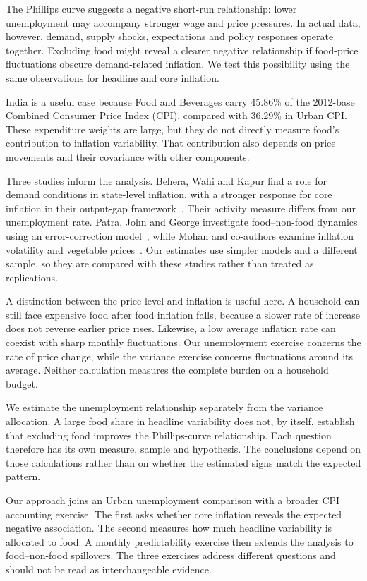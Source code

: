 \documentclass[10pt,a4paper]{article}
\begin{document}
The Phillips curve suggests a negative short-run relationship: lower unemployment may accompany stronger wage and price pressures. In actual data, however, demand, supply shocks, expectations and policy responses operate together. Excluding food might reveal a clearer negative relationship if food-price fluctuations obscure demand-related inflation. We test this possibility using the same observations for headline and core inflation.

India is a useful case because Food and Beverages carry 45.86\% of the 2012-base Combined Consumer Price Index (CPI), compared with 36.29\% in Urban CPI. These expenditure weights are large, but they do not directly measure food's contribution to inflation variability. That contribution also depends on price movements and their covariance with other components.

Three studies inform the analysis. Behera, Wahi and Kapur find a role for demand conditions in state-level inflation, with a stronger response for core inflation in their output-gap framework~\cite{behera2017}. Their activity measure differs from our unemployment rate. Patra, John and George investigate food--non-food dynamics using an error-correction model~\cite{patra2024}, while Mohan and co-authors examine inflation volatility and vegetable prices~\cite{mohan2026}. Our estimates use simpler models and a different sample, so they are compared with these studies rather than treated as replications.

A distinction between the price level and inflation is useful here. A household can still face expensive food after food inflation falls, because a slower rate of increase does not reverse earlier price rises. Likewise, a low average inflation rate can coexist with sharp monthly fluctuations. Our unemployment exercise concerns the rate of price change, while the variance exercise concerns fluctuations around its average. Neither calculation measures the complete burden on a household budget.

We estimate the unemployment relationship separately from the variance allocation. A large food share in headline variability does not, by itself, establish that excluding food improves the Phillips-curve relationship. Each question therefore has its own measure, sample and hypothesis. The conclusions depend on those calculations rather than on whether the estimated signs match the expected pattern.

Our approach joins an Urban unemployment comparison with a broader CPI accounting exercise. The first asks whether core inflation reveals the expected negative association. The second measures how much headline variability is allocated to food. A monthly predictability exercise then extends the analysis to food--non-food spillovers. The three exercises address different questions and should not be read as interchangeable evidence.
\end{document}
